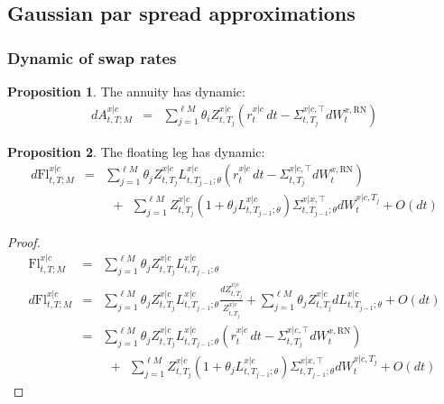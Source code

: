 \documentclass[11pt,english]{amsart}
\newcommand{\Fl}{\mathrm{Fl}}
\newcommand{\RN}{\mathrm{RN}}
\theoremstyle{definition}
\newtheorem{prop}{Proposition}
\begin{document}
\newpage%
\subsection{Gaussian par spread approximations}\label{ssec:lgcm_gaussian_par_spread}%



\subsubsection{Dynamic of swap rates}



\begin{prop}
The annuity has dynamic:
\begin{eqnarray*}
  dA^{x|c}_{t,T;M}  &=&  \sum_{j=1}^{\ell M} \theta_i Z^{x|c}_{t,T_j} \left( r^{x|c}_t \, dt - \Sigma^{x|c,\top}_{t,T_j} dW_t^{x,\RN} \right)
\end{eqnarray*}
\end{prop}




\begin{prop}
The floating leg has dynamic:
\begin{eqnarray*}
  d\Fl^{x|c}_{t,T;M}  &=&   \sum_{j=1}^{\ell M} \theta_j Z^{x|c}_{t,T_j} L^{x|c}_{t,T_{j-1};\theta}  \left( r^{x|c}_t \, dt - \Sigma^{x|c,\top}_{t,T_j} dW_t^{x,\RN} \right) \\
  & & ~~+~~ \sum_{j=1}^{\ell M} Z^{x|c}_{t,T_j} (1+\theta_j L^{x|c}_{t,T_{j-1};\theta}) \Sigma^{x|x,\top}_{t,T_{j-1};\theta} dW_t^{x|c,T_j} + O(dt)
\end{eqnarray*}
\end{prop}

\begin{proof}
\begin{eqnarray*}
\Fl^{x|c}_{t,T;M}  &=&   \sum_{j=1}^{\ell M} \theta_j Z^{x|c}_{t,T_j} L^{x|c}_{t,T_{j-1};\theta}  \\
  d\Fl^{x|c}_{t,T;M}  
  &=&   \sum_{j=1}^{\ell M} \theta_j Z^{x|c}_{t,T_j} L^{x|c}_{t,T_{j-1};\theta} \frac{dZ^{x|c}_{t,T_j} }{Z^{x|c}_{t,T_j} }  + \sum_{j=1}^{\ell M} \theta_j Z^{x|c}_{t,T_j} dL^{x|c}_{t,T_{j-1};\theta} + O(dt) \\
   &=&   \sum_{j=1}^{\ell M} \theta_j Z^{x|c}_{t,T_j} L^{x|c}_{t,T_{j-1};\theta}  \left( r^{x|c}_t \, dt - \Sigma^{x|c,\top}_{t,T_j} dW_t^{x,\RN} \right) \\
  & & ~~+~~ \sum_{j=1}^{\ell M} Z^{x|c}_{t,T_j} (1+\theta_j L^{x|c}_{t,T_{j-1};\theta}) \Sigma^{x|x,\top}_{t,T_{j-1};\theta} dW_t^{x|c,T_j} + O(dt)
\end{eqnarray*}
\end{proof}
\end{document}
